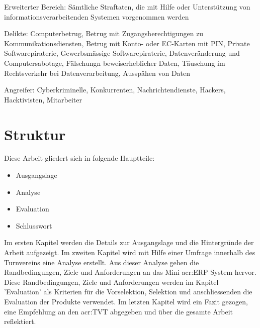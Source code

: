 Erweiterter Bereich: Sämtliche Straftaten, die mit Hilfe oder Unterstützung von informationsverarbeitenden Systemen vorgenommen werden

Delikte: Computerbetrug, Betrug mit Zugangsberechtigungen zu Kommunikationsdiensten, Betrug mit Konto- oder EC-Karten mit PIN, Private Softwarepiraterie, Gewerbsmässige Softwarepiraterie, Datenveränderung und Computersabotage, Fälschungn beweiserheblicher Daten, Täuschung im Rechtsverkehr bei Datenverarbeitung, Ausspähen von Daten

Angreifer: Cyberkriminelle, Konkurrenten, Nachrichtendienste, Hackers, Hacktivisten, Mitarbeiter

\section{Struktur}
Diese Arbeit gliedert sich in folgende Hauptteile:
\begin{itemize}
\item Ausgangslage
\item Analyse
\item Evaluation
\item Schlusswort
\end{itemize}

Im ersten Kapitel werden die Details zur Ausgangslage und die Hintergründe der Arbeit aufgezeigt. Im zweiten Kapitel wird mit Hilfe einer Umfrage innerhalb des Turnvereins eine Analyse erstellt. Aus dieser Analyse gehen die Randbedingungen, Ziele und Anforderungen an das Mini \gls{acr:ERP} System hervor. Diese Randbedingungen, Ziele und Anforderungen werden im Kapitel 'Evaluation' als Kriterien für die Vorselektion, Selektion und anschliessenden die Evaluation der Produkte verwendet. Im letzten Kapitel wird ein Fazit gezogen, eine Empfehlung an den \gls{acr:TVT} abgegeben und über die gesamte Arbeit reflektiert.

